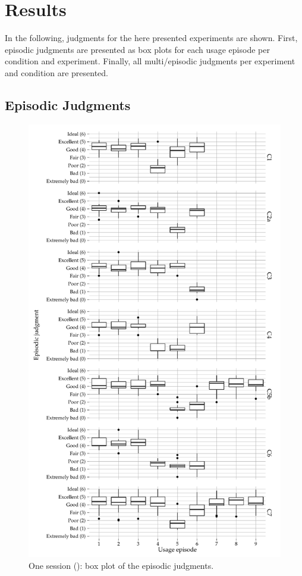 \chapter{Results}\label{appendix:results}
In the following, judgments for the here presented experiments are shown.
First, episodic judgments are presented as box plots for each usage episode per condition and experiment.
Finally, all multi\-/episodic judgments per experiment and condition are presented.

\newpage

\section{Episodic Judgments}

\begin{figure}[H]
	\centering
\begin{knitrout}
\color{fgcolor}
\includegraphics[width=\maxwidth]{figure/plotE1-1} 

\end{knitrout}
	\caption[One session (): box plot of the episodic judgments]{One session (): box plot of the episodic judgments.}
\end{figure}


